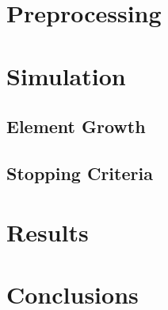 \section{Preprocessing}

\section{Simulation}

\subsection{Element Growth}

\subsection{Stopping Criteria}


\section{Results}



\section{Conclusions}